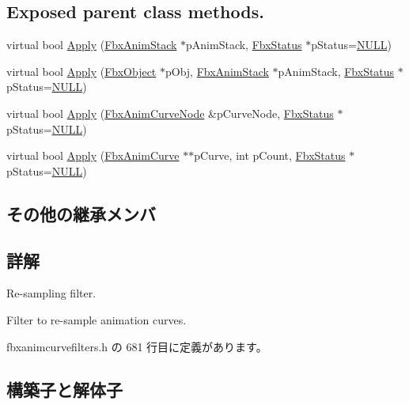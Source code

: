 \subsection*{Exposed parent class methods.}
\begin{DoxyCompactItemize}
\item 
virtual bool \hyperlink{class_fbx_anim_curve_filter_resample_a0f94e6a08f94ee1798b3bdce67285f53}{Apply} (\hyperlink{class_fbx_anim_stack}{Fbx\+Anim\+Stack} $\ast$p\+Anim\+Stack, \hyperlink{class_fbx_status}{Fbx\+Status} $\ast$p\+Status=\hyperlink{fbxarch_8h_a070d2ce7b6bb7e5c05602aa8c308d0c4}{N\+U\+LL})
\item 
virtual bool \hyperlink{class_fbx_anim_curve_filter_resample_a6f22a537869dc295ceff244f56ac561e}{Apply} (\hyperlink{class_fbx_object}{Fbx\+Object} $\ast$p\+Obj, \hyperlink{class_fbx_anim_stack}{Fbx\+Anim\+Stack} $\ast$p\+Anim\+Stack, \hyperlink{class_fbx_status}{Fbx\+Status} $\ast$p\+Status=\hyperlink{fbxarch_8h_a070d2ce7b6bb7e5c05602aa8c308d0c4}{N\+U\+LL})
\item 
virtual bool \hyperlink{class_fbx_anim_curve_filter_resample_a1359f91c344c6dd4d89fa0a883ae38b2}{Apply} (\hyperlink{class_fbx_anim_curve_node}{Fbx\+Anim\+Curve\+Node} \&p\+Curve\+Node, \hyperlink{class_fbx_status}{Fbx\+Status} $\ast$p\+Status=\hyperlink{fbxarch_8h_a070d2ce7b6bb7e5c05602aa8c308d0c4}{N\+U\+LL})
\item 
virtual bool \hyperlink{class_fbx_anim_curve_filter_resample_a2a095982e24a1ea1e35bc1ab97e833d7}{Apply} (\hyperlink{class_fbx_anim_curve}{Fbx\+Anim\+Curve} $\ast$$\ast$p\+Curve, int p\+Count, \hyperlink{class_fbx_status}{Fbx\+Status} $\ast$p\+Status=\hyperlink{fbxarch_8h_a070d2ce7b6bb7e5c05602aa8c308d0c4}{N\+U\+LL})
\end{DoxyCompactItemize}
\subsection*{その他の継承メンバ}


\subsection{詳解}
Re-\/sampling filter.

Filter to re-\/sample animation curves. 

 fbxanimcurvefilters.\+h の 681 行目に定義があります。



\subsection{構築子と解体子}
\mbox{\label{class_fbx_anim_curve_filter_resample_ae5da0aba84bf6db3d9cda6a4aeb5824f}} 
